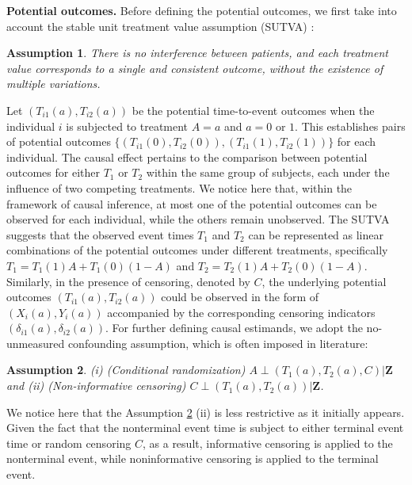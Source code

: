 \documentclass[aoas]{imsart}
\theoremstyle{plain}
\newtheorem{assum}{Assumption}
\def\bfZ{\mathbf{Z}}
\begin{document}
\textbf{Potential outcomes.} Before defining the potential outcomes, we first take into account the stable unit treatment value assumption (SUTVA) \citep{rubin1990comment}:
\begin{assum}
There is no interference between patients, and each treatment value corresponds to a single and consistent outcome, without the existence of multiple variations.
\label{assum:sutva}
\end{assum} 
Let $(T_{i1}(a),T_{i2}(a))$ be the potential time-to-event outcomes when the individual $i$ is subjected to treatment $A=a$ and $a=0$ or $1$. This establishes pairs of potential outcomes  $\{(T_{i1}(0),T_{i2}(0)),(T_{i1}(1),T_{i2}(1))\}$ for each individual. 
The causal effect pertains to the comparison between potential outcomes for either $T_1$ or $T_2$ within the same group of subjects, each under the influence of two competing treatments. We notice here that, within the framework of causal inference, at most one of the potential outcomes can be observed for each individual, while the others remain unobserved.  The SUTVA suggests that the observed event times $T_1$ and $T_2$ can be represented as linear combinations of the potential outcomes under different treatments, specifically $T_1=T_1(1)A+T_1(0)(1-A)$ and $T_2 = T_2(1)A+T_2(0)(1-A)$. 
Similarly, in the presence of censoring, denoted by $C$, the underlying potential outcomes $(T_{i1}(a),T_{i2}(a))$ could be observed in the form of $(X_{i}(a),Y_{i}(a))$ accompanied by the corresponding censoring indicators $(\delta_{i1}(a),\delta_{i2}(a))$. 
For further defining causal estimands, we adopt the no-unmeasured confounding assumption, which is often imposed in literature: 
\begin{assum} 
(i) (Conditional randomization) $A\perp (T_1(a), T_2(a), C)|\bfZ$
and (ii) (Non-informative censoring)  $C\perp (T_1(a), T_2(a))|\bfZ$.
\label{assum:random}
\end{assum}


We notice here that the Assumption \ref{assum:random} (ii) is less restrictive as it initially appears. Given the fact that the nonterminal event time is subject to either terminal event time or random censoring $C$, as a result, informative censoring is applied to the nonterminal event, while noninformative censoring is applied to the terminal event.
\end{document}
